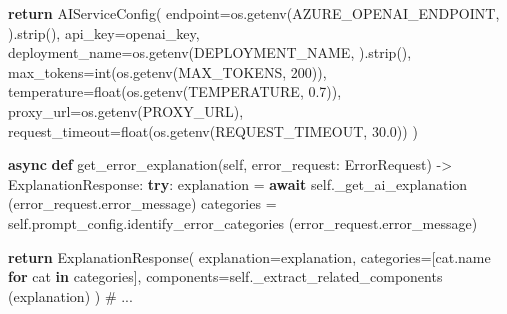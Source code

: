 \documentclass[
  a4paper,
  12pt,
  oneside,
  open=any,
  BCOR=12mm,
  DIV=14,
  parskip=half*,
  headsepline,
  footsepline,
  pointlessnumbers,
  liststotoc,
  numbers=noenddot,
  listof=totoc]{scrartcl}
\newenvironment{Shaded}{\begin{snugshade}}{\end{snugshade}}
\newcommand{\BuiltInTok}[1]{\textcolor[rgb]{0.00,0.23,0.31}{#1}}
\newcommand{\CommentTok}[1]{\textcolor[rgb]{0.37,0.37,0.37}{#1}}
\newcommand{\ControlFlowTok}[1]{\textcolor[rgb]{0.00,0.23,0.31}{\textbf{#1}}}
\newcommand{\KeywordTok}[1]{\textcolor[rgb]{0.00,0.23,0.31}{\textbf{#1}}}
\newcommand{\NormalTok}[1]{\textcolor[rgb]{0.00,0.23,0.31}{#1}}
\newcommand{\OperatorTok}[1]{\textcolor[rgb]{0.37,0.37,0.37}{#1}}
\newcommand{\StringTok}[1]{\textcolor[rgb]{0.13,0.47,0.30}{#1}}
\newcommand{\VariableTok}[1]{\textcolor[rgb]{0.07,0.07,0.07}{#1}}
\begin{document}
\begin{Shaded}
\begin{Highlighting}[]
        \ControlFlowTok{return}\NormalTok{ AIServiceConfig(}
\NormalTok{            endpoint}\OperatorTok{=}\NormalTok{os.getenv(}\StringTok{\textquotesingle{}AZURE\_OPENAI\_ENDPOINT\textquotesingle{}}\NormalTok{, }\StringTok{\textquotesingle{}\textquotesingle{}}\NormalTok{).strip(),}
\NormalTok{            api\_key}\OperatorTok{=}\NormalTok{openai\_key,}
\NormalTok{            deployment\_name}\OperatorTok{=}\NormalTok{os.getenv(}\StringTok{\textquotesingle{}DEPLOYMENT\_NAME\textquotesingle{}}\NormalTok{, }\StringTok{\textquotesingle{}\textquotesingle{}}\NormalTok{).strip(),}
\NormalTok{            max\_tokens}\OperatorTok{=}\BuiltInTok{int}\NormalTok{(os.getenv(}\StringTok{\textquotesingle{}MAX\_TOKENS\textquotesingle{}}\NormalTok{, }\StringTok{\textquotesingle{}200\textquotesingle{}}\NormalTok{)),}
\NormalTok{            temperature}\OperatorTok{=}\BuiltInTok{float}\NormalTok{(os.getenv(}\StringTok{\textquotesingle{}TEMPERATURE\textquotesingle{}}\NormalTok{, }\StringTok{\textquotesingle{}0.7\textquotesingle{}}\NormalTok{)),}
\NormalTok{            proxy\_url}\OperatorTok{=}\NormalTok{os.getenv(}\StringTok{\textquotesingle{}PROXY\_URL\textquotesingle{}}\NormalTok{),}
\NormalTok{            request\_timeout}\OperatorTok{=}\BuiltInTok{float}\NormalTok{(os.getenv(}\StringTok{\textquotesingle{}REQUEST\_TIMEOUT\textquotesingle{}}\NormalTok{, }
                                            \StringTok{\textquotesingle{}30.0\textquotesingle{}}\NormalTok{))}
\NormalTok{        )}

    \ControlFlowTok{async} \KeywordTok{def}\NormalTok{ get\_error\_explanation(}\VariableTok{self}\NormalTok{, error\_request: }
\NormalTok{                                    ErrorRequest) }\OperatorTok{{-}\textgreater{}} 
\NormalTok{                                    ExplanationResponse:}
        \ControlFlowTok{try}\NormalTok{:}
\NormalTok{            explanation }\OperatorTok{=} \ControlFlowTok{await} \VariableTok{self}\NormalTok{.\_get\_ai\_explanation}
\NormalTok{                                (error\_request.error\_message)}
\NormalTok{            categories }\OperatorTok{=} \VariableTok{self}\NormalTok{.prompt\_config.identify\_error\_categories}
\NormalTok{                                        (error\_request.error\_message)}

            \ControlFlowTok{return}\NormalTok{ ExplanationResponse(}
\NormalTok{                explanation}\OperatorTok{=}\NormalTok{explanation,}
\NormalTok{                categories}\OperatorTok{=}\NormalTok{[cat.name }\ControlFlowTok{for}\NormalTok{ cat }\KeywordTok{in}\NormalTok{ categories],}
\NormalTok{                components}\OperatorTok{=}\VariableTok{self}\NormalTok{.\_extract\_related\_components}
\NormalTok{                                (explanation)}
\NormalTok{            )}
 \CommentTok{\# ...}
\end{Highlighting}
\end{Shaded}
\end{document}
